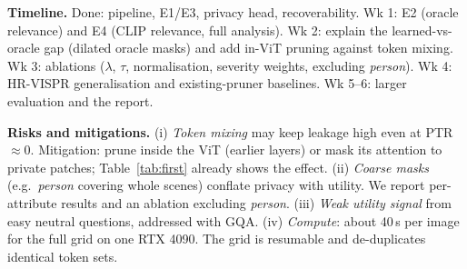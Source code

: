 \documentclass[10pt]{article}
\begin{document}
\textbf{Timeline.} Done: pipeline, E1/E3, privacy head, recoverability. Wk 1: E2 (oracle relevance) and E4 (CLIP relevance, full analysis).
Wk 2: explain the learned-vs-oracle gap (dilated oracle masks) and add in-ViT pruning against token mixing. Wk 3: ablations ($\lambda$, $\tau$, normalisation,
severity weights, excluding \emph{person}). Wk 4: HR-VISPR generalisation and existing-pruner baselines. Wk 5--6: larger evaluation and the report.

\textbf{Risks and mitigations.} (i) \emph{Token mixing} may keep leakage high even at PTR${\approx}0$. Mitigation: prune inside the ViT (earlier layers) or mask its
attention to private patches; Table~\ref{tab:first} already shows the effect. (ii) \emph{Coarse masks} (e.g.\ \emph{person} covering whole scenes)
conflate privacy with utility. We report per-attribute results and an ablation excluding \emph{person}. (iii) \emph{Weak utility signal} from easy neutral questions,
addressed with GQA. (iv) \emph{Compute}: about 40\,s per image for the full grid on one RTX 4090. The grid is resumable and de-duplicates identical token sets.

{\footnotesize
\setlength{\bibsep}{1pt}


}
\end{document}
